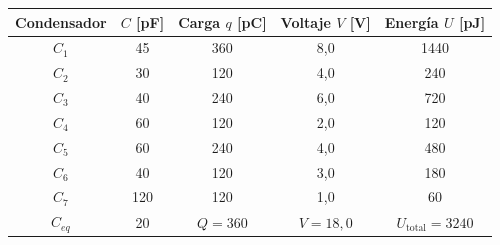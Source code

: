\documentclass[12pt,letterpaper]{article}
\begin{document}
\begin{center}
\renewcommand{\arraystretch}{1.2}
\begin{tabular}{|c|c|c|c|c|}
\hline
\textbf{Condensador} & \textbf{$C$ [pF]} & \textbf{Carga $q$ [pC]} & \textbf{Voltaje $V$ [V]} & \textbf{Energ\'ia $U$ [pJ]} \\
\hline
$C_1$ & 45  & 360 & 8{,}0 & 1440 \\
$C_2$ & 30  & 120 & 4{,}0 & 240 \\
$C_3$ & 40  & 240 & 6{,}0 & 720 \\
$C_4$ & 60  & 120 & 2{,}0 & 120 \\
$C_5$ & 60  & 240 & 4{,}0 & 480 \\
$C_6$ & 40  & 120 & 3{,}0 & 180 \\
$C_7$ & 120 & 120 & 1{,}0 & 60 \\
\hline
$C_{eq}$ & 20 & $Q = 360$ & $V = 18{,}0$ & $U_{\text{total}} = 3240$ \\
\hline
\end{tabular}
\end{center}
\end{document}

